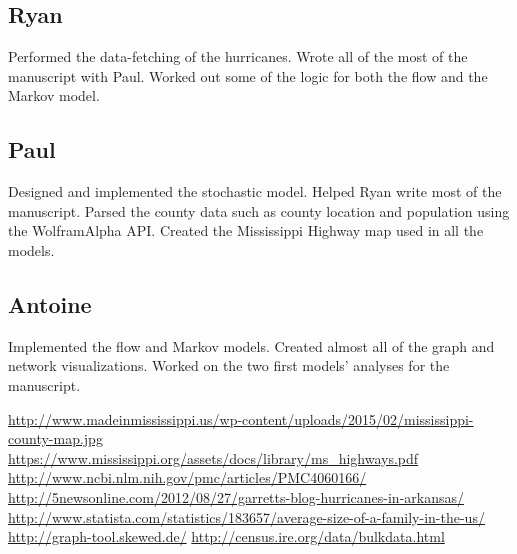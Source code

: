 \documentclass[titlepage]{article}
\begin{document}
\subsection*{Ryan}
Performed the data-fetching of the hurricanes. Wrote all of the most of the manuscript with Paul. Worked out some of the logic for both the flow and the Markov model.

\subsection*{Paul}
Designed and implemented the stochastic model. Helped Ryan write most of the manuscript. Parsed the county data such as county location and population using the WolframAlpha API. Created the Mississippi Highway map used in all the models.

\subsection*{Antoine}
Implemented the flow and Markov models. Created almost all of the graph and network visualizations. Worked on the two first models' analyses for the manuscript.

  \begin{thebibliography}{9}
      \url{http://www.madeinmississippi.us/wp-content/uploads/2015/02/mississippi-county-map.jpg}
      \url{https://www.mississippi.org/assets/docs/library/ms_highways.pdf}
      \url{http://www.ncbi.nlm.nih.gov/pmc/articles/PMC4060166/}
      \url{http://5newsonline.com/2012/08/27/garretts-blog-hurricanes-in-arkansas/}
      \url{http://www.statista.com/statistics/183657/average-size-of-a-family-in-the-us/}
      \url{http://graph-tool.skewed.de/}
      \url{http://census.ire.org/data/bulkdata.html}
  \end{thebibliography}






















\end{document}
